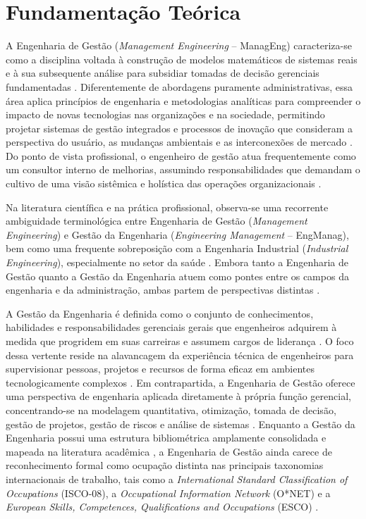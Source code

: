 \chapter[Fundamentação Teórica]{Fundamentação Teórica}

A Engenharia de Gestão (\textit{Management Engineering} -- ManagEng) caracteriza-se como a disciplina voltada à construção de modelos matemáticos de sistemas reais e à sua subsequente análise para subsidiar tomadas de decisão gerenciais fundamentadas \cite[p.~4]{kolker2012}. Diferentemente de abordagens puramente administrativas, essa área aplica princípios de engenharia e metodologias analíticas para compreender o impacto de novas tecnologias nas organizações e na sociedade, permitindo projetar sistemas de gestão integrados e processos de inovação que consideram a perspectiva do usuário, as mudanças ambientais e as interconexões de mercado \cite{duimering2013, elia2021}. Do ponto de vista profissional, o engenheiro de gestão atua frequentemente como um consultor interno de melhorias, assumindo responsabilidades que demandam o cultivo de uma visão sistêmica e holística das operações organizacionais \cite{larson2013}.

Na literatura científica e na prática profissional, observa-se uma recorrente ambiguidade terminológica entre Engenharia de Gestão (\textit{Management Engineering}) e Gestão da Engenharia (\textit{Engineering Management} -- EngManag), bem como uma frequente sobreposição com a Engenharia Industrial (\textit{Industrial Engineering}), especialmente no setor da saúde \cite{lannes2001, kotnour2005}. Embora tanto a Engenharia de Gestão quanto a Gestão da Engenharia atuem como pontes entre os campos da engenharia e da administração, ambas partem de perspectivas distintas \cite{elia2021}.

A Gestão da Engenharia é definida como o conjunto de conhecimentos, habilidades e responsabilidades gerenciais gerais que engenheiros adquirem à medida que progridem em suas carreiras e assumem cargos de liderança \cite{asem2019, shah2015}. O foco dessa vertente reside na alavancagem da experiência técnica de engenheiros para supervisionar pessoas, projetos e recursos de forma eficaz em ambientes tecnologicamente complexos \cite{mohn2022}. Em contrapartida, a Engenharia de Gestão oferece uma perspectiva de engenharia aplicada diretamente à própria função gerencial, concentrando-se na modelagem quantitativa, otimização, tomada de decisão, gestão de projetos, gestão de riscos e análise de sistemas \cite{kolker2012, duimering2013}. Enquanto a Gestão da Engenharia possui uma estrutura bibliométrica amplamente consolidada e mapeada na literatura acadêmica \cite{philbin2024, cardenas2023}, a Engenharia de Gestão ainda carece de reconhecimento formal como ocupação distinta nas principais taxonomias internacionais de trabalho, tais como a \textit{International Standard Classification of Occupations} (ISCO-08), a \textit{Occupational Information Network} (O*NET) e a \textit{European Skills, Competences, Qualifications and Occupations} (ESCO) \cite{ilo2012, onet, esco}.

